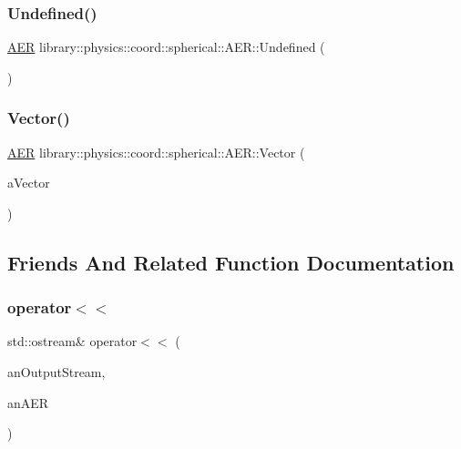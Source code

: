 \subsubsection{\texorpdfstring{Undefined()}{Undefined()}}
{\footnotesize\ttfamily \hyperlink{classlibrary_1_1physics_1_1coord_1_1spherical_1_1_a_e_r}{A\+ER} library\+::physics\+::coord\+::spherical\+::\+A\+E\+R\+::\+Undefined (\begin{DoxyParamCaption}{ }\end{DoxyParamCaption})\hspace{0.3cm}{\ttfamily [static]}}

\mbox{\label{classlibrary_1_1physics_1_1coord_1_1spherical_1_1_a_e_r_ad17b64ba28594943d96ca882333eec24}} 
\subsubsection{\texorpdfstring{Vector()}{Vector()}}
{\footnotesize\ttfamily \hyperlink{classlibrary_1_1physics_1_1coord_1_1spherical_1_1_a_e_r}{A\+ER} library\+::physics\+::coord\+::spherical\+::\+A\+E\+R\+::\+Vector (\begin{DoxyParamCaption}\item[{const Vector3d \&}]{a\+Vector }\end{DoxyParamCaption})\hspace{0.3cm}{\ttfamily [static]}}



\subsection{Friends And Related Function Documentation}
\mbox{\label{classlibrary_1_1physics_1_1coord_1_1spherical_1_1_a_e_r_ac5514fc65bf0bd3f4f5870b246cff3ad}} 
\subsubsection{\texorpdfstring{operator$<$$<$}{operator<<}}
{\footnotesize\ttfamily std\+::ostream\& operator$<$$<$ (\begin{DoxyParamCaption}\item[{std\+::ostream \&}]{an\+Output\+Stream,  }\item[{const \hyperlink{classlibrary_1_1physics_1_1coord_1_1spherical_1_1_a_e_r}{A\+ER} \&}]{an\+A\+ER }\end{DoxyParamCaption})\hspace{0.3cm}{\ttfamily [friend]}}



